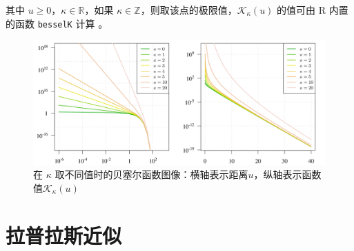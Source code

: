 \documentclass[12pt,a4paper,UTF8,twoside]{book}
\theoremstyle{definition}
\theoremstyle{definition}
\theoremstyle{definition}
\theoremstyle{remark}
\begin{document}
\noindent 其中 \(u \geq 0\)，\(\kappa \in \mathbb{R}\)，如果
\(\kappa \in \mathbb{Z}\)，则取该点的极限值，\(\mathcal{K}_{\kappa}(u)\)
的值可由 R 内置的函数 \texttt{besselK} 计算 \citep{Campbell1980}。

\begin{figure}

{\centering \includegraphics[width=0.7\linewidth]{figures/bessel} 

}

\caption{在 \(\kappa\)
取不同值时的贝塞尔函数图像：横轴表示距离\(u\)，纵轴表示函数值\(\mathcal{K}_{\kappa}(u)\)}\label{fig:bessel-function}
\end{figure}




\hypertarget{sec:Laplace-approximation}{%
\section{拉普拉斯近似}\label{sec:Laplace-approximation}}
\end{document}
